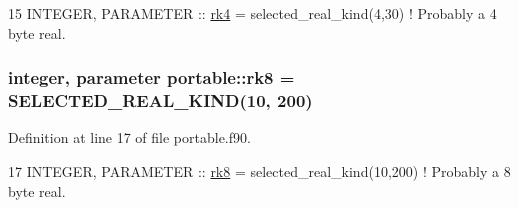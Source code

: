 \begin{DoxyCode}
15 \textcolor{keywordtype}{INTEGER}, \textcolor{keywordtype}{PARAMETER}  :: \hyperlink{namespaceportable_abaed22a509442771d3fba69bebda0b33}{rk4} = selected\_real\_kind(4,30)   \textcolor{comment}{! Probably a 4 byte real.}
\end{DoxyCode}
\subsubsection[{\texorpdfstring{rk8}{rk8}}]{\setlength{\rightskip}{0pt plus 5cm}integer, parameter portable\+::rk8 = S\+E\+L\+E\+C\+T\+E\+D\+\_\+\+R\+E\+A\+L\+\_\+\+K\+I\+ND(10, 200)}\hypertarget{namespaceportable_a609d4b38b4f128b310e288b1861ad9bd}{}\label{namespaceportable_a609d4b38b4f128b310e288b1861ad9bd}


Definition at line 17 of file portable.\+f90.


\begin{DoxyCode}
17 \textcolor{keywordtype}{INTEGER}, \textcolor{keywordtype}{PARAMETER}  :: \hyperlink{namespaceportable_a609d4b38b4f128b310e288b1861ad9bd}{rk8} = selected\_real\_kind(10,200) \textcolor{comment}{! Probably a 8 byte real.}
\end{DoxyCode}
